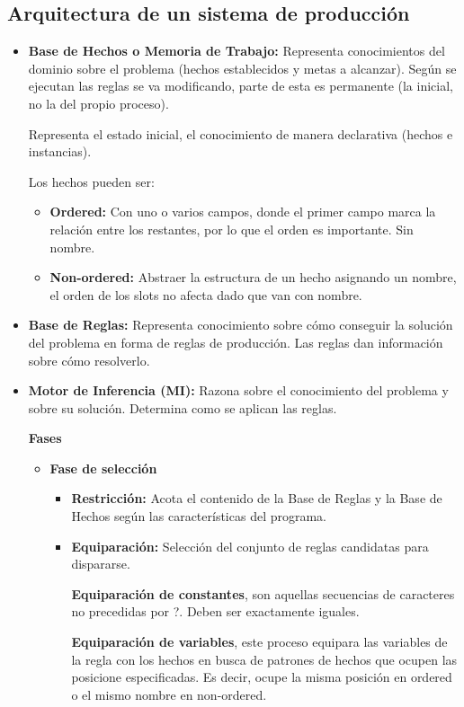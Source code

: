 \documentclass[12pt, twoside, openright]{report} %
\begin{document}
\subsection{Arquitectura de un sistema de producción}
\begin{itemize}
	\item \textbf{Base de Hechos o Memoria de Trabajo:} Representa conocimientos del dominio sobre el problema (hechos establecidos y metas a alcanzar). Según se ejecutan las reglas se va modificando, parte de esta es permanente (la inicial, no la del propio proceso).

	      Representa el estado inicial, el conocimiento de manera declarativa (hechos e instancias).

	      Los hechos pueden ser:
	      \begin{itemize}
		      \item \textbf{Ordered:} Con uno o varios campos, donde el primer campo marca la relación entre los restantes, por lo que el orden es importante. Sin nombre.
		      \item \textbf{Non-ordered:} Abstraer la estructura de un hecho asignando un nombre, el orden de los slots no afecta dado que van con nombre.
	      \end{itemize}
	\item \textbf{Base de Reglas:} Representa conocimiento sobre cómo conseguir la solución del problema en forma de reglas de producción. Las reglas dan información sobre cómo resolverlo.
	\item \textbf{Motor de Inferencia (MI):} Razona sobre el conocimiento del problema y sobre su solución. Determina como se aplican las reglas.

	      \pagebreak
	      \textbf{Fases}
	      \begin{itemize}
		      \item \textbf{Fase de selección}
		            \begin{itemize}
			            \item \textbf{Restricción:} Acota el contenido de la Base de Reglas y la Base de Hechos según las características del programa.
			            \item \textbf{Equiparación:} Selección del conjunto de reglas candidatas para dispararse.

			                  \textbf{Equiparación de constantes}, son aquellas secuencias de caracteres no precedidas por ?. Deben ser exactamente iguales.

			                  \textbf{Equiparación de variables}, este proceso equipara las variables de la regla con los hechos en busca de patrones de hechos que ocupen las posicione especificadas. Es decir, ocupe la misma posición en ordered o el mismo nombre en non-ordered.


\end{itemize}
\end{itemize}
\end{itemize}
\end{document}
